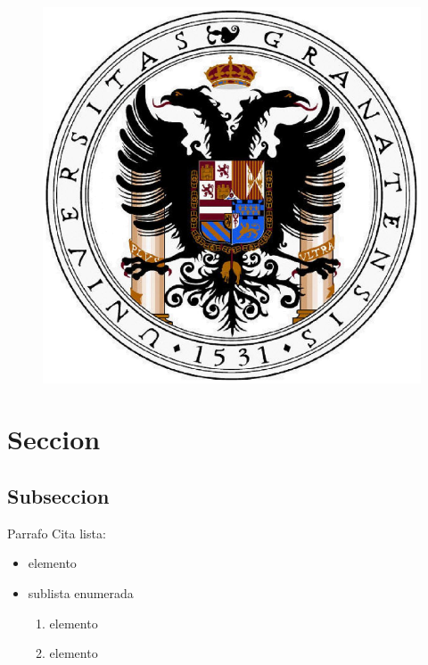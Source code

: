 \begin{figure}[H] %
	\centering
	\includegraphics[scale=0.8]{ugr.jpg}  %
	\label{ugr}

\end{figure}

\newpage %


\tableofcontents %

\listoffigures

\newpage


\section{Seccion}
\subsection{Subseccion}
Parrafo
\newline
Cita
\cite{cita1b}
\newline
lista:
\begin{itemize}
	\item elemento
	\item sublista enumerada

	\begin{enumerate}
		\item elemento
		\item elemento
	\end{enumerate}
\end{itemize}

